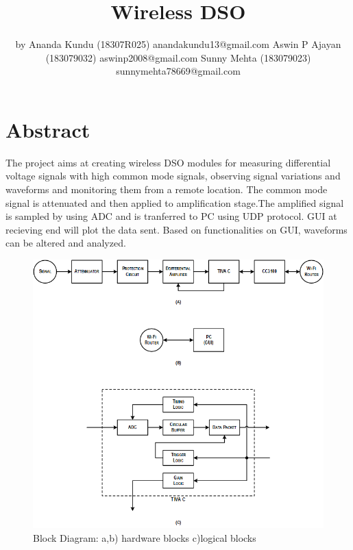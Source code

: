 \documentclass{article}
\begin{document}
	\author{by \endline Ananda Kundu	(18307R025)	 anandakundu13@gmail.com 
		\endline Aswin P Ajayan	(183079032) 	aswinp2008@gmail.com
		\endline Sunny Mehta	(183079023) 	sunnymehta78669@gmail.com}
	\title{Wireless DSO}
	\maketitle
	
	\section{Abstract}
	The project aims at creating wireless DSO modules for measuring differential
voltage signals with high common mode signals, observing signal variations and
waveforms and monitoring them from a remote location. The common mode
signal is attenuated and then applied to amplification stage.The amplified signal
is sampled by using ADC and is tranferred to PC using UDP protocol. GUI at
recieving end will plot the data sent. Based on functionalities on GUI, waveforms
can be altered and analyzed.
	\begin{figure}
		\centering
		\includegraphics[width=0.7\linewidth]{BlockDiagram}
		\caption{Block Diagram: a,b) hardware blocks c)logical blocks}
		\label{fig:blockdiagram}
	\end{figure}
	
	
\end{document}
